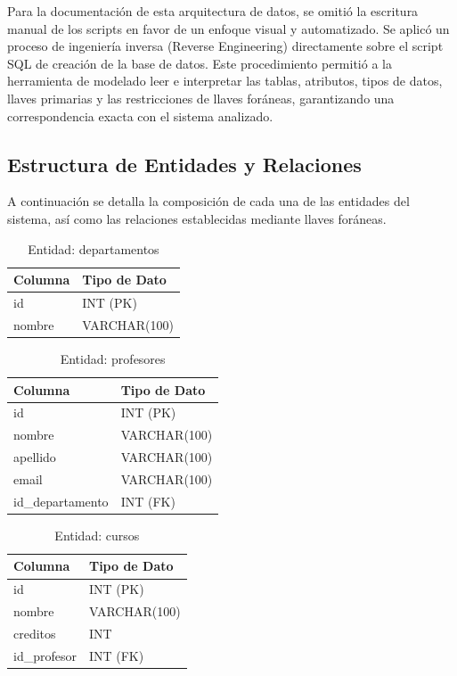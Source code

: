 \documentclass[12pt,letterpaper]{article}
\begin{document}
Para la documentación de esta arquitectura de datos, se omitió la escritura manual de los scripts en favor de un enfoque visual y automatizado. Se aplicó un proceso de ingeniería inversa (Reverse Engineering) directamente sobre el script SQL de creación de la base de datos. Este procedimiento permitió a la herramienta de modelado leer e interpretar las tablas, atributos, tipos de datos, llaves primarias y las restricciones de llaves foráneas, garantizando una correspondencia exacta con el sistema analizado.

\subsection{Estructura de Entidades y Relaciones}

A continuación se detalla la composición de cada una de las entidades del sistema, así como las relaciones establecidas mediante llaves foráneas.

\begin{table}[H]
    \centering
    \begin{tabular}{|l|l|}
    \hline
    \textbf{Columna} & \textbf{Tipo de Dato} \\ \hline
    id & INT (PK) \\ 
    nombre & VARCHAR(100) \\ \hline
    \end{tabular}
    \caption{Entidad: departamentos}
\end{table}

\begin{table}[H]
    \centering
    \begin{tabular}{|l|l|}
    \hline
    \textbf{Columna} & \textbf{Tipo de Dato} \\ \hline
    id & INT (PK) \\ 
    nombre & VARCHAR(100) \\ 
    apellido & VARCHAR(100) \\ 
    email & VARCHAR(100) \\ 
    id\_departamento & INT (FK) \\ \hline
    \end{tabular}
    \caption{Entidad: profesores}
\end{table}

\begin{table}[H]
    \centering
    \begin{tabular}{|l|l|}
    \hline
    \textbf{Columna} & \textbf{Tipo de Dato} \\ \hline
    id & INT (PK) \\ 
    nombre & VARCHAR(100) \\ 
    creditos & INT \\ 
    id\_profesor & INT (FK) \\ \hline
    \end{tabular}
    \caption{Entidad: cursos}
\end{table}
\end{document}
